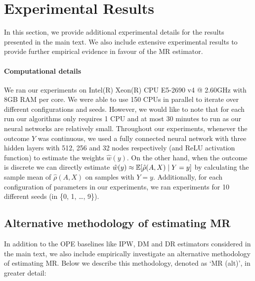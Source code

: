 \section{Experimental Results}\label{app:experiments}
In this section, we provide additional experimental details for the results presented in the main text. We also include extensive experimental results to provide further empirical evidence in favour of the MR estimator. 

\paragraph{Computational details}
We ran our experiments on Intel(R) Xeon(R) CPU E5-2690 v4 @ 2.60GHz with 8GB RAM
per core. We were able to use 150 CPUs in parallel to iterate over different configurations and seeds.
However, we would like to note that for each run our algorithms only requires 1 CPU and at most 30 minutes to run as our neural networks are relatively small. Throughout our experiments, whenever the outcome $Y$ was continuous, we used a fully connected neural network with three hidden layers with 512, 256 and 32 nodes respectively (and ReLU activation function) to estimate the weights $\hat{w}(y)$. On the other hand, when the outcome is discrete we can directly estimate $\hat{w}(y) \approx \mathbb{E}[\hat{\rho}(A, X)\mid Y=y]$ by calculating the sample mean of $\hat{\rho}(A, X)$ on samples with $Y=y$. Additionally, for each configuration of parameters in our experiments, we ran experiments for 10 different seeds (in \{0, 1, \ldots, 9\}).

\subsection{Alternative methodology of estimating MR}
In addition to the OPE baselines like IPW, DM and DR estimators considered in the main text, we also include empirically investigate an alternative methodology of estimating MR.
Below we describe this methodology, denoted as `MR (alt)', in greater detail:
